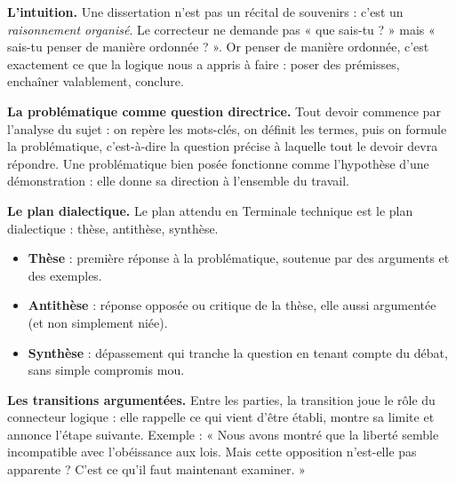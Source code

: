 \documentclass[11pt]{article}
\newcommand{\cle}[1]{{\popxbold\color{popdark}#1}}
\begin{document}
\textbf{L'intuition.} Une dissertation n'est pas un récital de souvenirs : c'est un \emph{raisonnement organisé}. Le correcteur ne demande pas « que sais-tu ? » mais « sais-tu penser de manière ordonnée ? ». Or penser de manière ordonnée, c'est exactement ce que la logique nous a appris à faire : poser des prémisses, enchaîner valablement, conclure.

\textbf{La problématique comme question directrice.} Tout devoir commence par l'analyse du sujet : on repère les mots-clés, on définit les termes, puis on formule la \cle{problématique}, c'est-à-dire la question précise à laquelle tout le devoir devra répondre. Une problématique bien posée fonctionne comme l'hypothèse d'une démonstration : elle donne sa direction à l'ensemble du travail.

\textbf{Le plan dialectique.} Le plan attendu en Terminale technique est le plan \cle{dialectique} : thèse, antithèse, synthèse.

\begin{itemize}
\item \textbf{Thèse} : première réponse à la problématique, soutenue par des arguments et des exemples.
\item \textbf{Antithèse} : réponse opposée ou critique de la thèse, elle aussi argumentée (et non simplement niée).
\item \textbf{Synthèse} : dépassement qui tranche la question en tenant compte du débat, sans simple compromis mou.
\end{itemize}

\textbf{Les transitions argumentées.} Entre les parties, la \cle{transition} joue le rôle du connecteur logique : elle rappelle ce qui vient d'être établi, montre sa limite et annonce l'étape suivante. Exemple : « Nous avons montré que la liberté semble incompatible avec l'obéissance aux lois. Mais cette opposition n'est-elle pas apparente ? C'est ce qu'il faut maintenant examiner. »
\end{document}
